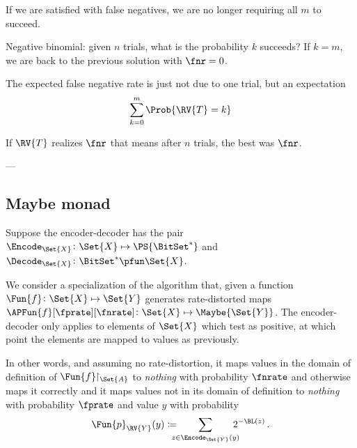 \documentclass[ ../main.tex]{subfiles}
\begin{document}
If we are satisfied with false negatives, we are no longer requiring all $m$ to succeed.

Negative binomial: given $n$ trials, what is the probability $k$ succeeds? If $k=m$, we are back to the previous solution with $\fnr = 0$.

The expected false negative rate is just not due to one trial, but an expectation
\begin{equation}
	\sum_{k=0}^{m} \Prob{\RV{T} = k} 
\end{equation}

If $\RV{T}$ realizes $\fnr$ that means after $n$ trials, the best was $\fnr$.


---





\subsection{Maybe monad}
Suppose the encoder-decoder has the pair $\Encode_{\Set{X}} \colon \Set{X} \mapsto \PS{\BitSet^*}$ and $\Decode_{\Set{X}} \colon \BitSet^* \pfun \Set{X}$.

We consider a specialization of the algorithm that, given a function $\Fun{f} \colon \Set{X} \mapsto \Set{Y}$ generates rate-distorted maps $\APFun{f}[\fprate][\fnrate] \colon \Set{X} \mapsto \Maybe{\Set{Y}}$.
The encoder-decoder only applies to elements of $\Set{X}$ which test as positive, at which point the elements are mapped to values as previously.

In other words, and assuming no rate-distortion, it maps values in the domain of definition of $\Fun{f}\!\!\restriction_{\Set{A}}$ to \emph{nothing} with probability $\fnrate$ and otherwise maps it correctly and it maps values not in its domain of definition to \emph{nothing} with probability $\fprate$ and value $y$ with probability
\begin{equation}
	\Fun{p}_{\RV{Y}}(y) \coloneqq \!\!\!\!\! \sum_{z \in \Encode_{\Set{Y}}(y)} \!\!\!\!\! 2^{-\BL(z)}\,.
\end{equation}
\end{document}
